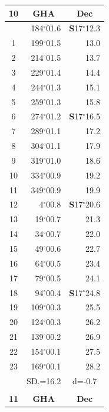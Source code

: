 \documentclass[10pt, a4paper]{report}
\begin{document}
\begin{scriptsize}
\begin{tabular*}{0.2\textwidth}[t]{@{\extracolsep{\fill}}|c|rr|}
\hline
\multicolumn{1}{|c|}{\rule{0pt}{2.6ex}\textbf{10}} & \multicolumn{1}{c}{\textbf{GHA}} & \multicolumn{1}{c|}{\textbf{Dec}}\\
\hline\rule{0pt}{2.6ex}\noindent
0 & 184$^\circ$01.6 & \textbf{S}17$^\circ$12.3\\
1 & 199$^\circ$01.5 & 13.0\\
2 & 214$^\circ$01.5 & 13.7\\
3 & 229$^\circ$01.4 & \raisebox{0.24ex}{\boldmath$\cdot$~\boldmath$\cdot$~~}14.4\\
4 & 244$^\circ$01.3 & 15.1\\
5 & 259$^\circ$01.3 & 15.8\\[2Pt]
6 & 274$^\circ$01.2 & \textbf{S}17$^\circ$16.5\\
7 & 289$^\circ$01.1 & 17.2\\
8 & 304$^\circ$01.1 & 17.9\\
9 & 319$^\circ$01.0 & \raisebox{0.24ex}{\boldmath$\cdot$~\boldmath$\cdot$~~}18.6\\
10 & 334$^\circ$00.9 & 19.2\\
11 & 349$^\circ$00.9 & 19.9\\[2Pt]
12 & 4$^\circ$00.8 & \textbf{S}17$^\circ$20.6\\
13 & 19$^\circ$00.7 & 21.3\\
14 & 34$^\circ$00.7 & 22.0\\
15 & 49$^\circ$00.6 & \raisebox{0.24ex}{\boldmath$\cdot$~\boldmath$\cdot$~~}22.7\\
16 & 64$^\circ$00.5 & 23.4\\
17 & 79$^\circ$00.5 & 24.1\\[2Pt]
18 & 94$^\circ$00.4 & \textbf{S}17$^\circ$24.8\\
19 & 109$^\circ$00.3 & 25.5\\
20 & 124$^\circ$00.3 & 26.2\\
21 & 139$^\circ$00.2 & \raisebox{0.24ex}{\boldmath$\cdot$~\boldmath$\cdot$~~}26.9\\
22 & 154$^\circ$00.1 & 27.5\\
23 & 169$^\circ$00.1 & 28.2\\
\hline
\rule{0pt}{2.4ex} & \multicolumn{1}{c}{SD.=16.2} & \multicolumn{1}{c|}{d=-0.7}\\
\hline
\multicolumn{1}{c}{}\\[-0.5ex]\hline
\multicolumn{1}{|c|}{\rule{0pt}{2.6ex}\textbf{11}} & \multicolumn{1}{c}{\textbf{GHA}} & \multicolumn{1}{c|}{\textbf{Dec}}\\

\end{tabular*}
\end{scriptsize}
\end{document}
